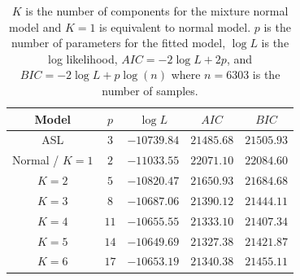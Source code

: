 \begin{table}[h]
  \centering
  \begin{tabular}{ccccc} \hline\hline
  Model & $p$  & $\log L$    & $AIC$      & $BIC$ \\ \hline
  ASL   & $3$  & $-10739.84$ & $21485.68$ & $21505.93$ \\
  Normal /
  $K=1$ & $2$  & $-11033.55$ & $22071.10$ & $22084.60$ \\
  $K=2$ & $5$  & $-10820.47$ & $21650.93$ & $21684.68$ \\
  $K=3$ & $8$  & $-10687.06$ & $21390.12$ & $21444.11$ \\
  $K=4$ & $11$ & $-10655.55$ & $21333.10$ & $21407.34$ \\
  $K=5$ & $14$ & $-10649.69$ & $21327.38$ & $21421.87$ \\
  $K=6$ & $17$ & $-10653.19$ & $21340.38$ & $21455.11$ \\
  \hline\hline
  \end{tabular}
  \caption{$K$ is the number of components for the mixture normal model
           and $K=1$ is equivalent to normal model.
           $p$ is the number of parameters for the fitted model,
           $\log L$ is the log likelihood, $AIC = -2 \log L + 2p$, and
           $BIC = -2 \log L + p\log(n)$ where $n = 6303$ is
           the number of samples.}
  \label{tab:asl_mixture}
\end{table}
